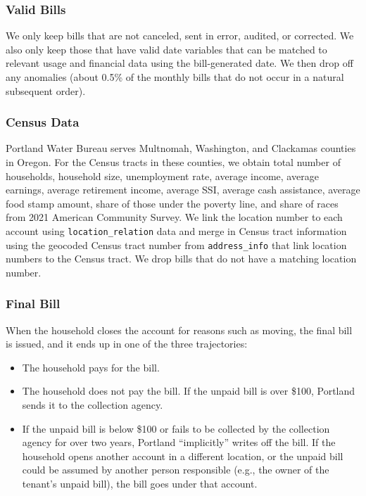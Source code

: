 \documentclass[11pt]{article}
\begin{document}
\subsubsection*{Valid Bills}

We only keep bills that are not canceled, sent in error, audited, or corrected. We also only keep those that have valid date variables that can be matched to relevant usage and financial data using the bill-generated date. We then drop off any anomalies (about 0.5\% of the monthly bills that do not occur in a natural subsequent order).

\subsubsection*{Census Data}

Portland Water Bureau serves Multnomah, Washington, and Clackamas counties in Oregon. For the Census tracts in these counties, we obtain total number of households, household size, unemployment rate, average income, average earnings, average retirement income, average SSI, average cash assistance, average food stamp amount, share of those under the poverty line, and share of races from 2021 American Community Survey. We link the location number to each account using \texttt{location\_relation} data and merge in Census tract information using the geocoded Census tract number from \texttt{address\_info} that link location numbers to the Census tract. We drop bills that do not have a matching location number.

\subsubsection*{Final Bill}

When the household closes the account for reasons such as moving, the final bill is issued, and it ends up in one of the three trajectories:
\begin{itemize}
	\item The household pays for the bill.
	\item The household does not pay the bill. If the unpaid bill is over \$100, Portland sends it to the collection agency.
	\item If the unpaid bill is below \$100 or fails to be collected by the collection agency for over two years, Portland ``implicitly'' writes off the bill. If the household opens another account in a different location, or the unpaid bill could be assumed by another person responsible (e.g., the owner of the tenant's unpaid bill), the bill goes under that account.
\end{itemize}
\end{document}
